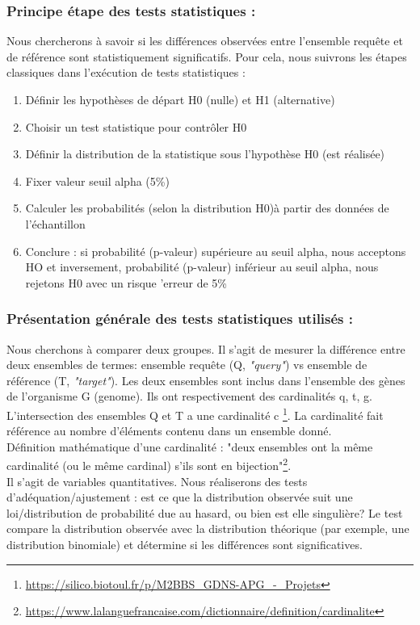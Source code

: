 \documentclass[a4paper,11pt,openright]{report}
\begin{document}
\subsubsection{Principe étape des tests statistiques : }
Nous chercherons à savoir si les différences observées entre l'ensemble requête et de référence sont statistiquement significatifs. Pour cela, nous suivrons les étapes classiques dans l'exécution de tests statistiques :
\begin{enumerate}
\item Définir les hypothèses de départ H0 (nulle) et H1 (alternative) 
\item Choisir un test statistique pour contrôler H0
\item Définir la distribution de la statistique sous l’hypothèse H0 (est réalisée)
\item Fixer valeur seuil alpha (5\%)
\item Calculer les probabilités (selon la distribution H0)à partir des données de l’échantillon 
\item Conclure : si probabilité (p-valeur) supérieure au seuil alpha, nous acceptons HO et inversement, probabilité (p-valeur) inférieur au seuil alpha, nous rejetons H0 avec un risque 'erreur de 5\%
\end{enumerate}

	\subsubsection{Présentation générale des tests statistiques utilisés : }
Nous cherchons à comparer deux groupes. Il s'agit de mesurer la différence entre deux ensembles de termes: ensemble requête (Q, \textit{"query"}) vs ensemble de référence (T, \textit{"target"}). Les deux ensembles sont inclus dans l'ensemble des gènes de l'organisme G (genome). Ils ont respectivement des cardinalités q, t, g. L'intersection des ensembles Q et T a une cardinalité c \footnote{\url{https://silico.biotoul.fr/p/M2BBS_GDNS-APG_-_Projets}}. La cardinalité fait référence au nombre d'éléments contenu dans un ensemble donné. \\ 
Définition mathématique d'une cardinalité : "deux ensembles ont la même cardinalité (ou le même cardinal) s’ils sont en bijection"\footnote{\url{https://www.lalanguefrancaise.com/dictionnaire/definition/cardinalite}}. \\ 

Il s'agit de variables quantitatives. Nous réaliserons des tests d'adéquation/ajustement : est ce que la distribution observée suit une loi/distribution de probabilité due au hasard, ou bien est elle singulière?
Le test compare la distribution observée avec la distribution théorique (par exemple, une distribution binomiale) et détermine si les différences sont significatives.\\
\end{document}
